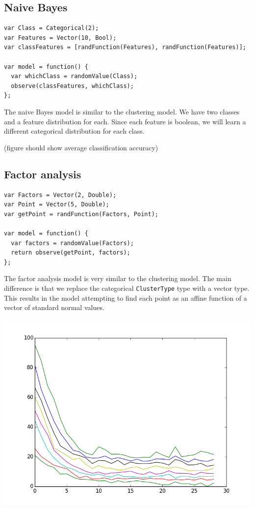 \documentclass{article}
\begin{document}
\subsection{Naive Bayes}

{\small
\begin{lstlisting}
var Class = Categorical(2);
var Features = Vector(10, Bool);
var classFeatures = [randFunction(Features), randFunction(Features)];

var model = function() {
  var whichClass = randomValue(Class);
  observe(classFeatures, whichClass);
};
\end{lstlisting}
}

The naive Bayes model is similar to the clustering model.  We have two classes and a feature
distribution for each.  Since each feature is boolean, we will learn
a different categorical distribution for each class.

(figure should show average classification accuracy)

  \subsection{Factor analysis}
{\small
\begin{lstlisting}
var Factors = Vector(2, Double);
var Point = Vector(5, Double);
var getPoint = randFunction(Factors, Point);

var model = function() {
  var factors = randomValue(Factors);
  return observe(getPoint, factors);
};
\end{lstlisting}
}

The factor analysis model is very similar to the clustering model.  The main difference is that we replace the categorical \texttt{ClusterType} type with a vector type.  This results in the model attempting to find each point as an affine function of a vector of standard normal values.

\begin{center}
  \includegraphics[scale=0.5]{../plots/accuracy_factor_analysis.png}
\end{center}
\end{document}
